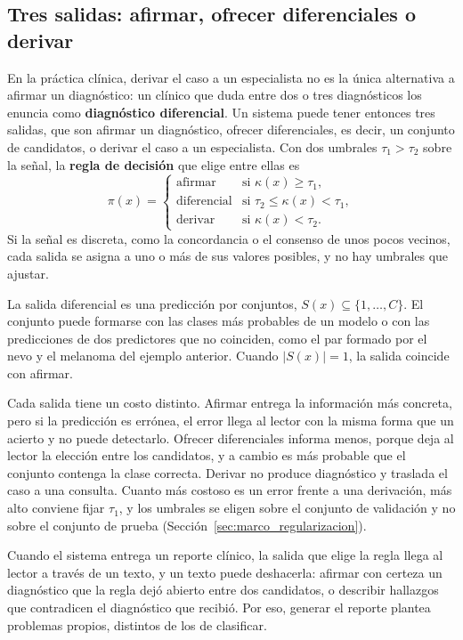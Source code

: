 \subsection{Tres salidas: afirmar, ofrecer diferenciales o derivar}
\label{sec:marco_tres_salidas}

En la práctica clínica, derivar el caso a un especialista no es la única alternativa a afirmar un diagnóstico: un clínico que duda entre
dos o tres diagnósticos los enuncia como \textbf{diagnóstico diferencial}. Un sistema puede tener entonces tres
salidas, que son afirmar un diagnóstico, ofrecer diferenciales, es decir, un conjunto de candidatos, o derivar
el caso a un especialista. Con dos umbrales $\tau_1 > \tau_2$ sobre la señal, la \textbf{regla de decisión} que elige entre
ellas es
\begin{equation}
    \pi(x) =
    \begin{cases}
        \text{afirmar} & \text{si } \kappa(x) \ge \tau_1,\\
        \text{diferencial} & \text{si } \tau_2 \le \kappa(x) < \tau_1,\\
        \text{derivar} & \text{si } \kappa(x) < \tau_2.
    \end{cases}
    \label{eq:marco_politica}
\end{equation}
Si la señal es discreta, como la concordancia o el consenso de unos pocos vecinos, cada salida se asigna a uno o
más de sus valores posibles, y no hay umbrales que ajustar.

La salida diferencial es una predicción por conjuntos, $S(x) \subseteq \{1, \dots, C\}$. El conjunto puede
formarse con las clases más probables de un modelo o con las predicciones de dos predictores que no coinciden, como el par formado por el nevo y el melanoma del ejemplo
anterior. Cuando $|S(x)| = 1$, la salida coincide con afirmar.

Cada salida tiene un costo distinto. Afirmar entrega la información más concreta, pero si la predicción es
errónea, el error llega al lector con la misma forma que un acierto y no puede detectarlo. Ofrecer diferenciales
informa menos, porque deja al lector la elección entre los candidatos, y a cambio es más probable que el
conjunto contenga la clase correcta. Derivar no produce diagnóstico y traslada el caso a una consulta. Cuanto
más costoso es un error frente a una derivación, más alto conviene fijar $\tau_1$, y los umbrales se eligen sobre
el conjunto de validación y no sobre el conjunto de prueba (Sección~\ref{sec:marco_regularizacion}).

Cuando el sistema entrega un reporte clínico, la salida que elige la regla llega al lector a través de un
texto, y un texto puede deshacerla: afirmar con certeza un diagnóstico que la regla dejó abierto entre dos
candidatos, o describir hallazgos que contradicen el diagnóstico que recibió. Por eso, generar el reporte
plantea problemas propios, distintos de los de clasificar.
